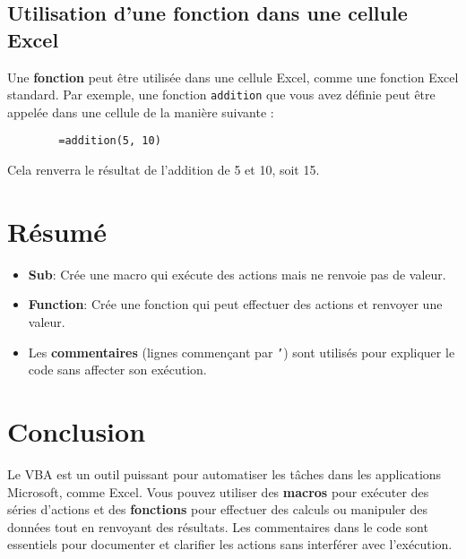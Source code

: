 \documentclass[a4paper,12pt]{report}
\begin{document}
	\subsection{Utilisation d'une fonction dans une cellule Excel}
	Une \textbf{fonction} peut être utilisée dans une cellule Excel, comme une fonction Excel standard. Par exemple, une fonction \texttt{addition} que vous avez définie peut être appelée dans une cellule de la manière suivante :
	
	\begin{verbatim}
		=addition(5, 10)
	\end{verbatim}
	
	Cela renverra le résultat de l'addition de 5 et 10, soit 15.
	
	\section{Résumé}
	\begin{itemize}
		\item \textbf{Sub}: Crée une macro qui exécute des actions mais ne renvoie pas de valeur.
		\item \textbf{Function}: Crée une fonction qui peut effectuer des actions et renvoyer une valeur.
		\item Les \textbf{commentaires} (lignes commençant par \texttt{'}) sont utilisés pour expliquer le code sans affecter son exécution.
	\end{itemize}
	
	\section{Conclusion}
	Le VBA est un outil puissant pour automatiser les tâches dans les applications Microsoft, comme Excel. Vous pouvez utiliser des \textbf{macros} pour exécuter des séries d'actions et des \textbf{fonctions} pour effectuer des calculs ou manipuler des données tout en renvoyant des résultats. Les commentaires dans le code sont essentiels pour documenter et clarifier les actions sans interférer avec l'exécution.
	
\end{document}
